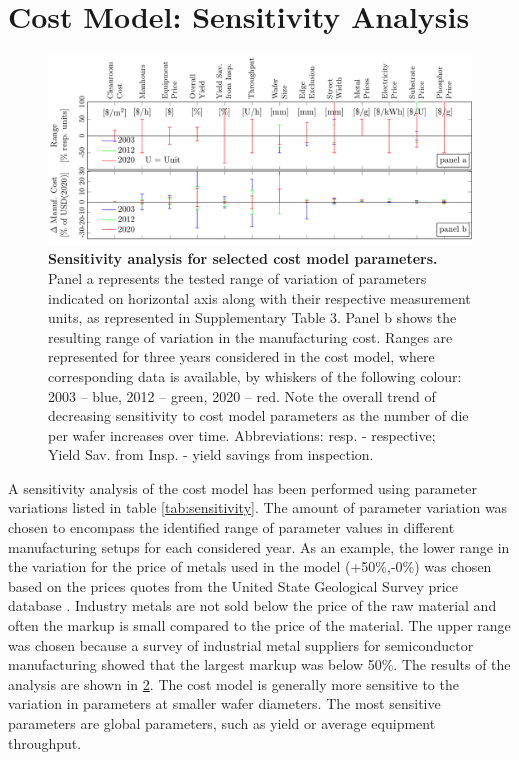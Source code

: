 \documentclass[parskip=full]{article}
\begin{document}
\begin{figure}[H]
\label{fig:phosphor_spectrum}
\end{figure}

\newpage
\section{Cost Model: Sensitivity Analysis}

\begin{figure}[ht!]
	\centering
    \includegraphics[width=\textwidth]{./figures/costmodel_sensitivity.pdf}
	\caption{\textbf{Sensitivity analysis for selected cost model parameters.} Panel a represents the tested range of variation of parameters indicated on horizontal axis along with their respective measurement units, as represented in Supplementary Table 3. Panel b shows the resulting range of variation in the manufacturing cost. Ranges are represented for three years considered in the cost model, where corresponding data is available, by whiskers of the following colour: 2003 – blue, 2012 – green, 2020 – red. Note the overall trend of decreasing sensitivity to cost model parameters as the number of die per wafer increases over time. Abbreviations: resp. - respective; Yield Sav. from Insp. - yield savings from inspection.}
	\label{fig:sensitivity}
\end{figure}

A sensitivity analysis of the cost model has been performed using parameter variations listed in table \cref{tab:sensitivity}. The amount of parameter variation was chosen to encompass the identified range of parameter values in different manufacturing setups for each considered year. As an example, the lower range in the variation for the price of metals used in the model (+50\%,-0\%) was chosen based on the prices quotes from the United State Geological Survey price database \cite{usgeoprices}. Industry metals are not sold below the price of the raw material and often the markup is small compared to the price of the material. The upper range was chosen because a survey of industrial metal suppliers for semiconductor manufacturing showed that the largest markup was below 50\%. The results of the analysis are shown in  \cref{fig:sensitivity}. The cost model is generally more sensitive to the variation in parameters at smaller wafer diameters. The most sensitive parameters are global parameters, such as yield or average equipment throughput.
\end{document}
